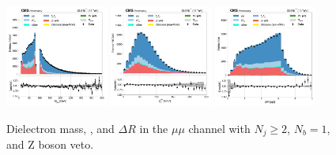 \begin{figure}[htb!]
    \centering
    \includegraphics[width=0.3\textwidth]{chapters/Appendix/sectionPlots/figures/data_mc_overlays/mumu_2016_cat_gt2_eq1_b_signal_linear_lepton_dilepton1_mass}
    \includegraphics[width=0.3\textwidth]{chapters/Appendix/sectionPlots/figures/data_mc_overlays/mumu_2016_cat_gt2_eq1_b_signal_linear_lepton_dilepton1_pt}
    \includegraphics[width=0.3\textwidth]{chapters/Appendix/sectionPlots/figures/data_mc_overlays/mumu_2016_cat_gt2_eq1_b_signal_linear_lepton_dilepton1_delta_r}
    \caption{Dielectron mass, \pt, and $\Delta R$ in the $\mu\mu$ channel
    with $N_{j} \geq 2$, $N_{b} = 1$, and Z boson veto.}
    \label{fig:mumu_1_dilepton}
\end{figure}

